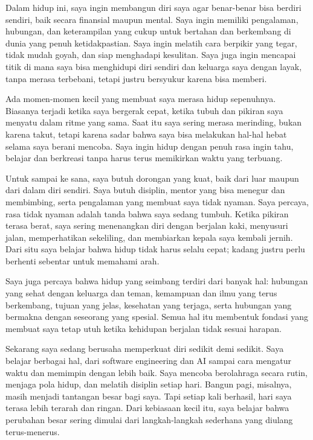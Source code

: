 \documentclass[
  letterpaper,
  DIV=11,
  numbers=noendperiod]{scrreprt}
\begin{document}
Dalam hidup ini, saya ingin membangun diri saya agar benar-benar bisa
berdiri sendiri, baik secara finansial maupun mental. Saya ingin
memiliki pengalaman, hubungan, dan keterampilan yang cukup untuk
bertahan dan berkembang di dunia yang penuh ketidakpastian. Saya ingin
melatih cara berpikir yang tegar, tidak mudah goyah, dan siap menghadapi
kesulitan. Saya juga ingin mencapai titik di mana saya bisa menghidupi
diri sendiri dan keluarga saya dengan layak, tanpa merasa terbebani,
tetapi justru bersyukur karena bisa memberi.

Ada momen-momen kecil yang membuat saya merasa hidup sepenuhnya.
Biasanya terjadi ketika saya bergerak cepat, ketika tubuh dan pikiran
saya menyatu dalam ritme yang sama. Saat itu saya sering merasa
merinding, bukan karena takut, tetapi karena sadar bahwa saya bisa
melakukan hal-hal hebat selama saya berani mencoba. Saya ingin hidup
dengan penuh rasa ingin tahu, belajar dan berkreasi tanpa harus terus
memikirkan waktu yang terbuang.

Untuk sampai ke sana, saya butuh dorongan yang kuat, baik dari luar
maupun dari dalam diri sendiri. Saya butuh disiplin, mentor yang bisa
menegur dan membimbing, serta pengalaman yang membuat saya tidak nyaman.
Saya percaya, rasa tidak nyaman adalah tanda bahwa saya sedang tumbuh.
Ketika pikiran terasa berat, saya sering menenangkan diri dengan
berjalan kaki, menyusuri jalan, memperhatikan sekeliling, dan membiarkan
kepala saya kembali jernih. Dari situ saya belajar bahwa hidup tidak
harus selalu cepat; kadang justru perlu berhenti sebentar untuk memahami
arah.

Saya juga percaya bahwa hidup yang seimbang terdiri dari banyak hal:
hubungan yang sehat dengan keluarga dan teman, kemampuan dan ilmu yang
terus berkembang, tujuan yang jelas, kesehatan yang terjaga, serta
hubungan yang bermakna dengan seseorang yang spesial. Semua hal itu
membentuk fondasi yang membuat saya tetap utuh ketika kehidupan berjalan
tidak sesuai harapan.

Sekarang saya sedang berusaha memperkuat diri sedikit demi sedikit. Saya
belajar berbagai hal, dari software engineering dan AI sampai cara
mengatur waktu dan memimpin dengan lebih baik. Saya mencoba berolahraga
secara rutin, menjaga pola hidup, dan melatih disiplin setiap hari.
Bangun pagi, misalnya, masih menjadi tantangan besar bagi saya. Tapi
setiap kali berhasil, hari saya terasa lebih terarah dan ringan. Dari
kebiasaan kecil itu, saya belajar bahwa perubahan besar sering dimulai
dari langkah-langkah sederhana yang diulang terus-menerus.
\end{document}
